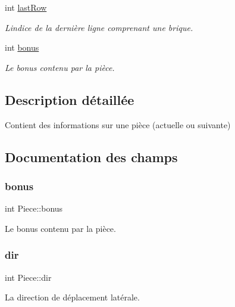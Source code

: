 \begin{DoxyCompactItemize}
int \hyperlink{struct_piece_aaea62498ff2f91c00dddbe798e73397a}{last\+Row}
\begin{DoxyCompactList}\small\item\em L\textquotesingle{}indice de la dernière ligne comprenant une brique. \end{DoxyCompactList}\item 
int \hyperlink{struct_piece_a3c899f47b3b274539617033d1da8f368}{bonus}
\begin{DoxyCompactList}\small\item\em Le bonus contenu par la pièce. \end{DoxyCompactList}\end{DoxyCompactItemize}


\subsection{Description détaillée}
Contient des informations sur une pièce (actuelle ou suivante) 

\subsection{Documentation des champs}
\mbox{\label{struct_piece_a3c899f47b3b274539617033d1da8f368}} 
\subsubsection{\texorpdfstring{bonus}{bonus}}
{\footnotesize\ttfamily int Piece\+::bonus}



Le bonus contenu par la pièce. 

\mbox{\label{struct_piece_a0d6d230858b211a68fbb4e410998a636}} 
\subsubsection{\texorpdfstring{dir}{dir}}
{\footnotesize\ttfamily int Piece\+::dir}



La direction de déplacement latérale. 

\mbox{\label{struct_piece_a9ad7f55e97faf9230b2921295a8f18b5}} 
